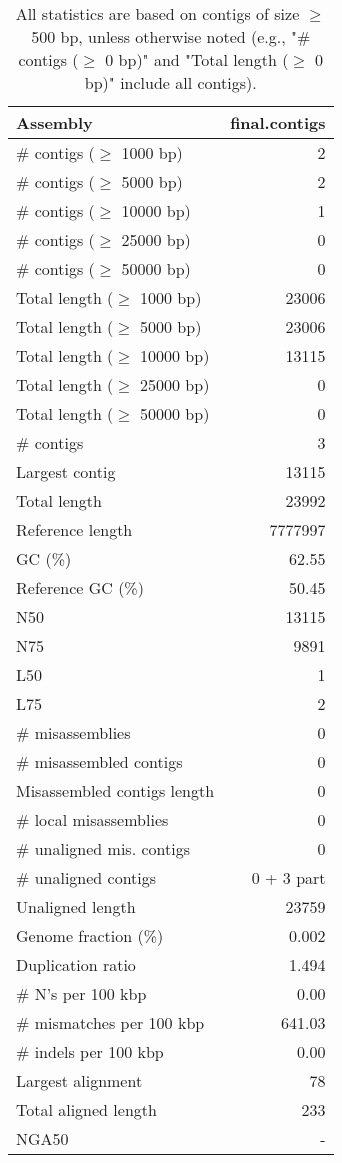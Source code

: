 \documentclass[12pt,a4paper]{article}
\begin{document}
\begin{table}[ht]
\begin{center}
\caption{All statistics are based on contigs of size $\geq$ 500 bp, unless otherwise noted (e.g., "\# contigs ($\geq$ 0 bp)" and "Total length ($\geq$ 0 bp)" include all contigs).}
\begin{tabular}{|l*{1}{|r}|}
\hline
Assembly & final.contigs \\ \hline
\# contigs ($\geq$ 1000 bp) & 2 \\ \hline
\# contigs ($\geq$ 5000 bp) & 2 \\ \hline
\# contigs ($\geq$ 10000 bp) & 1 \\ \hline
\# contigs ($\geq$ 25000 bp) & 0 \\ \hline
\# contigs ($\geq$ 50000 bp) & 0 \\ \hline
Total length ($\geq$ 1000 bp) & 23006 \\ \hline
Total length ($\geq$ 5000 bp) & 23006 \\ \hline
Total length ($\geq$ 10000 bp) & 13115 \\ \hline
Total length ($\geq$ 25000 bp) & 0 \\ \hline
Total length ($\geq$ 50000 bp) & 0 \\ \hline
\# contigs & 3 \\ \hline
Largest contig & 13115 \\ \hline
Total length & 23992 \\ \hline
Reference length & 7777997 \\ \hline
GC (\%) & 62.55 \\ \hline
Reference GC (\%) & 50.45 \\ \hline
N50 & 13115 \\ \hline
N75 & 9891 \\ \hline
L50 & 1 \\ \hline
L75 & 2 \\ \hline
\# misassemblies & 0 \\ \hline
\# misassembled contigs & 0 \\ \hline
Misassembled contigs length & 0 \\ \hline
\# local misassemblies & 0 \\ \hline
\# unaligned mis. contigs & 0 \\ \hline
\# unaligned contigs & 0 + 3 part \\ \hline
Unaligned length & 23759 \\ \hline
Genome fraction (\%) & 0.002 \\ \hline
Duplication ratio & 1.494 \\ \hline
\# N's per 100 kbp & 0.00 \\ \hline
\# mismatches per 100 kbp & 641.03 \\ \hline
\# indels per 100 kbp & 0.00 \\ \hline
Largest alignment & 78 \\ \hline
Total aligned length & 233 \\ \hline
NGA50 & - \\ \hline
\end{tabular}
\end{center}
\end{table}
\end{document}
